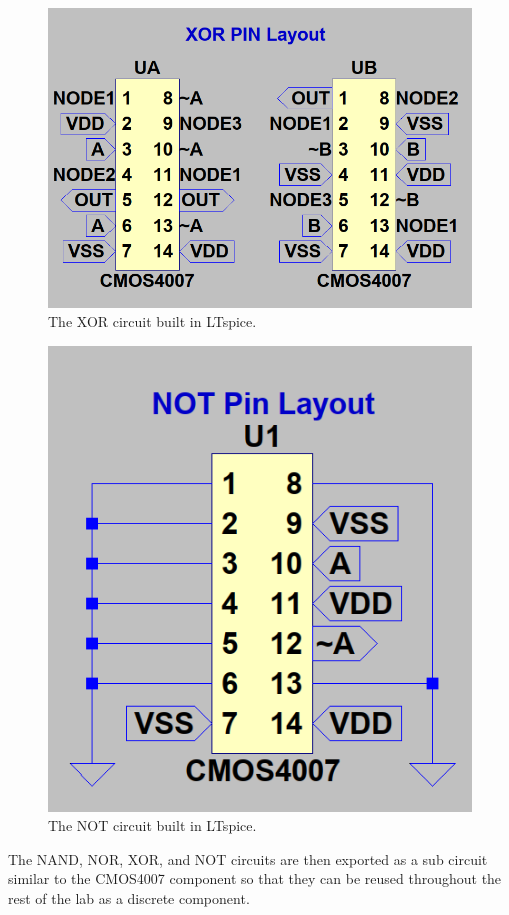 \documentclass[12pt, titlepage]{article}
\begin{document}
\begin{multicols}{2}
\begin{figure}[H]
            \centering
            \includegraphics[width=0.6\linewidth]{figures/XOR_circuit.png}
            \caption{The XOR circuit built in LTspice.}
            \label{fig:XOR_lt}
        \end{figure}
        \begin{figure}[H]
            \centering
            \includegraphics[width=0.6\linewidth]{figures/NOT_circuit.png}
            \caption{The NOT circuit built in LTspice.}
            \label{fig:NOT_lt}
        \end{figure}
    \end{multicols}
    The NAND, NOR, XOR, and NOT circuits are then exported as a sub
    circuit similar to the CMOS4007 component so that they can be reused
    throughout the rest of the lab as a discrete component.
\end{document}
